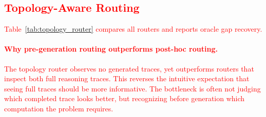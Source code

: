 \documentclass[11pt]{article}
\begin{document}
\textcolor{red}{\subsection{Topology-Aware Routing}
\label{sec:topology_routing}}

\textcolor{red}{Table~\ref{tab:topology_router} compares all routers and reports oracle gap recovery.}

\begin{table}[t]
\centering
\small
{}
\caption{\textcolor{red}{Router comparison with oracle gap recovery (\%, averaged across datasets). The topology router observes no generated traces yet outperforms output-based routers on all three benchmarks.}}
\label{tab:topology_router}
\end{table}

\textcolor{red}{\paragraph{Why pre-generation routing outperforms post-hoc routing.}
The topology router observes no generated traces, yet outperforms routers that inspect both full reasoning traces. This reverses the intuitive expectation that seeing full traces should be more informative. The bottleneck is often not judging which completed trace looks better, but recognizing before generation which computation the problem requires.}
\end{document}
